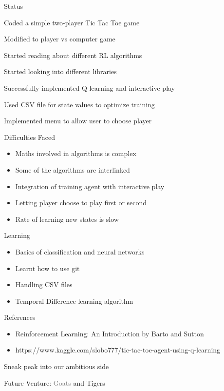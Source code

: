 \documentclass[14pt]{beamer}
\begin{document}
\begin{frame}{Status}
    \begin{description}[STATUS]
        \item[\color{myPink}{24 Jun}] Coded a simple two-player Tic Tac Toe game
        \item[\color{myPink}{27 Jun}] Modified to player vs computer game
        \item[\color{myPink}{29 Jun}] Started reading about different RL algorithms
        \item[\color{myPink}{04 Jul}] Started looking into different libraries
        \item[\color{myPink}{11 Jul}] Successfully implemented Q learning and interactive play
        \item[\color{myPink}{12 Jul}] Used CSV file for state values to optimize training
        \item[\color{myPink}{10 Aug}] Implemented menu to allow user to choose player
    \end{description}
\end{frame}

\begin{frame}{Difficulties Faced}
    \begin{itemize}
        \item Maths involved in algorithms is complex
        \item Some of the algorithms are interlinked
        \item Integration of training agent with interactive play
        \item Letting player choose to play first or second
        \item Rate of learning new states is slow
    \end{itemize}
\end{frame}

\begin{frame}{Learning}
    \begin{itemize}
        \item Basics of classification and neural networks
        \item Learnt how to use git
        \item Handling CSV files
        \item Temporal Difference learning algorithm
    \end{itemize}
\end{frame}

\begin{frame}{References}
    \begin{itemize}
        \item Reinforcement Learning: An Introduction by Barto and Sutton
        \item https://www.kaggle.com/slobo777/tic-tac-toe-agent-using-q-learning
    \end{itemize}
\end{frame}

\begin{frame}{Sneak peak into our ambitious side}
    \begin{center}
        Future Venture: \textcolor{gray}{Goats} and \textcolor{myAmber}{Tigers}
    \end{center}
\end{frame}
\end{document}
